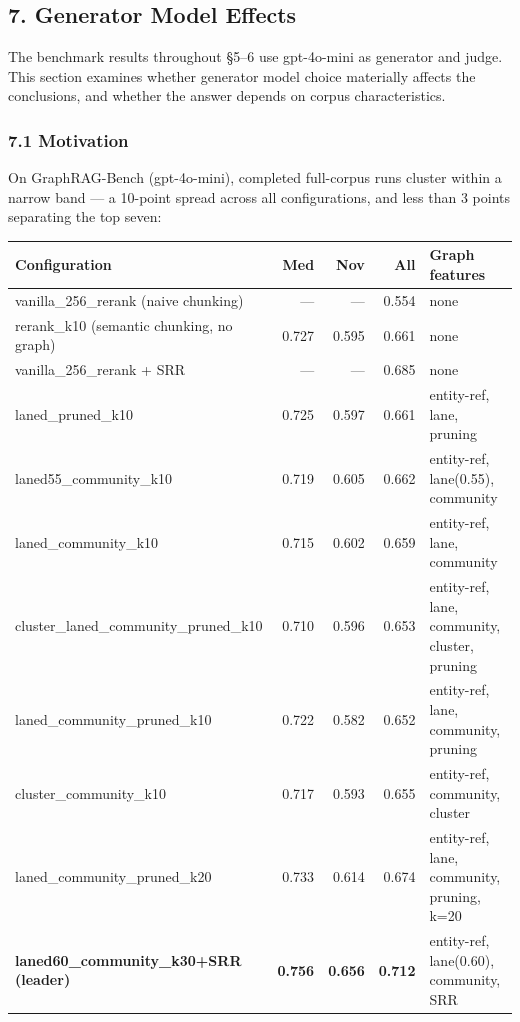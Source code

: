 \subsection{7. Generator Model Effects}\label{generator-model-effects}

The benchmark results throughout §5--6 use gpt-4o-mini as generator and judge. This section examines whether generator model choice materially affects the conclusions, and whether the answer depends on corpus characteristics.

\subsubsection{7.1 Motivation}\label{motivation}

On GraphRAG-Bench (gpt-4o-mini), completed full-corpus runs cluster within a narrow band --- a 10-point spread across all configurations, and less than 3 points separating the top seven:

\begin{small}
\setlength{\tabcolsep}{4pt}
\begin{longtable}{p{2.3in}rrrp{1.6in}}
\toprule
\textbf{Configuration} & \textbf{Med} & \textbf{Nov} & \textbf{All} & \textbf{Graph features} \\
\midrule
\endhead
vanilla\_256\_rerank (naive chunking) & — & — & 0.554 & none \\
rerank\_k10 (semantic chunking, no graph) & 0.727 & 0.595 & 0.661 & none \\
vanilla\_256\_rerank + SRR & — & — & 0.685 & none \\
laned\_pruned\_k10 & 0.725 & 0.597 & 0.661 & entity-ref, lane, pruning \\
laned55\_community\_k10 & 0.719 & 0.605 & 0.662 & entity-ref, lane(0.55), community \\
laned\_community\_k10 & 0.715 & 0.602 & 0.659 & entity-ref, lane, community \\
cluster\_laned\_community\_pruned\_k10 & 0.710 & 0.596 & 0.653 & entity-ref, lane, community, cluster, pruning \\
laned\_community\_pruned\_k10 & 0.722 & 0.582 & 0.652 & entity-ref, lane, community, pruning \\
cluster\_community\_k10 & 0.717 & 0.593 & 0.655 & entity-ref, community, cluster \\
laned\_community\_pruned\_k20 & 0.733 & 0.614 & 0.674 & entity-ref, lane, community, pruning, k=20 \\
\textbf{laned60\_community\_k30+SRR (leader)} & \textbf{0.756} & \textbf{0.656} & \textbf{0.712} & entity-ref, lane(0.60), community, SRR \\
\bottomrule
\end{longtable}
\end{small}

